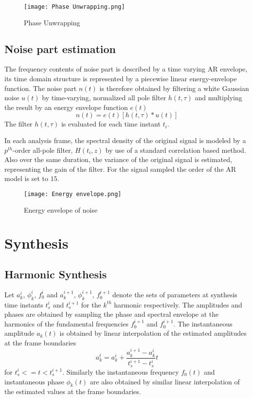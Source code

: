 \documentclass[BTech]{nitkdiss}
\begin{document}
\begin{figure}[H]
\centering
\texttt{[image: Phase Unwrapping.png]}
\caption{Phase Unwrapping}
\end{figure}

\subsection{Noise part estimation}
The frequency contents of noise part is described by a time varying AR envelope, its time domain structure is represented by a piecewise linear energy-envelope function.
The noise part $n(t)$ is therefore obtained by filtering a white Gaussian noise $u(t)$ by  time-varying, normalized all pole filter $h(t,\tau)$ and multiplying the result by an energy envelope function $e(t)$ $$n(t)=e(t)[h(t,\tau)\ast u(t)]$$ The filter $h(t,\tau)$ is evaluated for each time instant $t_{i}$.

In each analysis frame, the spectral density of the original signal is modeled by a $p^{th}$-order all-pole filter, $H(t_{i},z)$ by use of a standard correlation based method. Also over the same duration, the variance of the original signal is estimated, representing the gain of the filter. For the signal sampled the order of the AR model is set to $15$.

\begin{figure}[H]
\centering
\texttt{[image: Energy envelope.png]}
\caption{Energy envelope of noise}
\end{figure}

\section{Synthesis}

\subsection{Harmonic Synthesis}
Let $a_{k}^{i}$, $\phi_{k}^{i}$, $f_{0}^{i}$ and $a_{k}^{i+1}$, $\phi_{k}^{i+1}$, $f_{0}^{i+1}$ denote the sets of parameters at synthesis time instants $t_{s}^{i}$ and $t_{s}^{i+1}$ for the $k^{th}$ harmonic respectively. The amplitudes and phases are obtained by sampling the phase and spectral envelope at the harmonics of the fundamental frequencies $f_{0}^{i+1}$ and $f_{0}^{i+1}$. The instantaneous amplitude $a_{k}(t)$ is obtained by linear interpolation of the estimated amplitudes at the frame boundaries $$a_{k}^{t}=a_{k}^{i} + \dfrac{a_{k}^{i+1}-a_{k}^{i}}{t_{s}^{i+1}-t_{s}^{i}}t$$ for $t_{s}^{i}<=t<t_{s}^{i+1}$. Similarly the instantaneous frequency $f_{0}(t)$ and instantaneous phase $\phi_{k}(t)$ are also obtained by similar linear interpolation of the estimated values at the frame boundaries.
\end{document}
